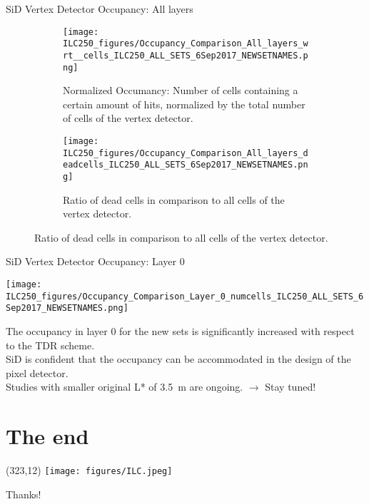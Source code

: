 \documentclass[xcolor={dvipsnames}]{beamer}
\newcommand{\ilclogo}{
  \setlength{\TPHorizModule}{1pt}
  \setlength{\TPVertModule}{1pt}
  \begin{textblock}{1}(323,12)
   \texttt{[image: figures/ILC.jpeg]}
  \end{textblock}
}
\begin{document}
\begin{frame}{SiD Vertex Detector Occupancy: All layers}
 \begin{figure}
\centering
\begin{subfigure}[t]{0.45\textwidth}
\centering
\texttt{[image: ILC250\_figures/Occupancy\_Comparison\_All\_layers\_wrt\_\_cells\_ILC250\_ALL\_SETS\_6Sep2017\_NEWSETNAMES.png]}
\caption{Normalized Occumancy: Number of cells containing a certain amount of hits, normalized by the total number of cells of the vertex detector.}
\end{subfigure}
\hspace*{0.1cm}
\begin{subfigure}[t]{0.45\textwidth}
\centering
\texttt{[image: ILC250\_figures/Occupancy\_Comparison\_All\_layers\_deadcells\_ILC250\_ALL\_SETS\_6Sep2017\_NEWSETNAMES.png]}
\caption{Ratio of dead cells in comparison to all cells of the vertex detector.}
\end{subfigure}
\end{figure}
\end{frame}

\begin{frame}{SiD Vertex Detector Occupancy: Layer 0}
\begin{center}
 \texttt{[image: ILC250\_figures/Occupancy\_Comparison\_Layer\_0\_numcells\_ILC250\_ALL\_SETS\_6Sep2017\_NEWSETNAMES.png]}
\end{center}
The occupancy in layer 0 for the new sets is significantly increased with respect to the TDR scheme.\\
SiD is confident that the occupancy can be accommodated in the design of the pixel detector.\\
Studies with smaller original L* of \SI{3.5}{\meter} are ongoing. $\rightarrow$ \alert{Stay tuned!}
\end{frame}



\section*{The end}
{
\begin{frame}
\ilclogo
\begin{center}
\textcolor{RubineRed}{
	\LARGE Thanks!\\
}
\end{center}
\end{frame}
}
\end{document}
